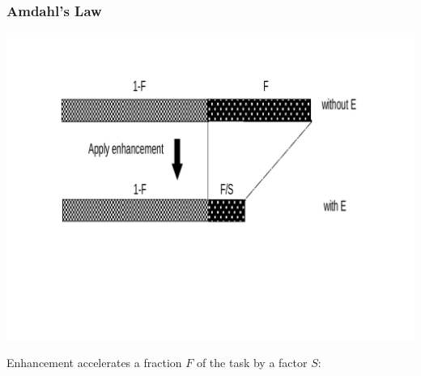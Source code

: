 \documentclass{beamer}
\begin{document}
\begin{frame}[fragile,t]
\frametitle{Amdahl's Law}
\vspace{-5ex}
\includegraphics[width=47ex]{Figures/L1/Amdhal}
\vspace{-7ex}

Enhancement accelerates a fraction $F$ of the task by a factor $S$:\bigskip

\bigskip


\end{frame}
\end{document}
